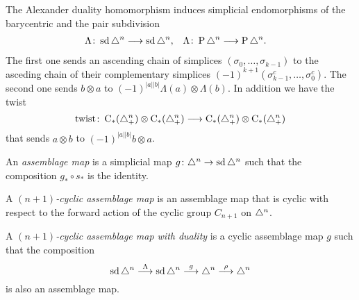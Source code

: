 The Alexander duality homomorphism induces simplicial endomorphisms of the barycentric and the pair subdivision
\begin{align*}
	\Lambda\colon \operatorname{sd} \triangle^n&\longrightarrow \operatorname{sd} \triangle^n,
	&
	\Lambda\colon \operatorname{P} \triangle^n&\longrightarrow \operatorname{P} \triangle^n.
\end{align*}
The first one sends an ascending chain of simplices $(\sigma_0,\ldots,\sigma_{k-1})$ to the asceding chain of their complementary simplices $(-1)^{k+1}(\sigma_{k-1}^c,\ldots,\sigma_0^c)$. The second one sends $b\otimes a$ to $(-1)^{|a||b|}\Lambda(a)\otimes \Lambda(b)$. In addition we have the twist
\[\mathrm{twist}\colon \operatorname{C}_*(\triangle_{+}^n)\otimes \operatorname{C}_*(\triangle_{+}^n)\longrightarrow \operatorname{C}_*(\triangle_{+}^n)\otimes \operatorname{C}_*(\triangle_{+}^n)\]
that sends $a\otimes b$ to $(-1)^{|a||b|} b\otimes a$.
\begin{definition}
	An \emph{assemblage map} is a simplicial map $g\colon \triangle^n\to \operatorname{sd} \triangle^n$ such that the composition $g_*\circ s_*$ is the identity.
\end{definition}
\begin{definition}
	A \emph{$(n+1)$-cyclic assemblage map} is an assemblage map that is cyclic with respect to the forward action of the cyclic group $C_{n+1}$ on $\triangle^n$.
\end{definition}
\begin{definition}
	A \emph{$(n+1)$-cyclic assemblage map with duality} is a cyclic assemblage map $g$ such that the composition
	\[\operatorname{sd} \triangle^n \overset{\Lambda}{\longrightarrow} \operatorname{sd} \triangle^n \overset{g}{\longrightarrow} \triangle^n\overset{\rho}{\longrightarrow} \triangle^n \]
	is also an assemblage map.
\end{definition}


